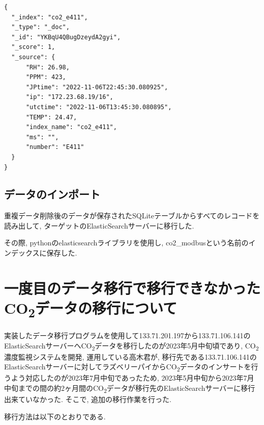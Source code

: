 \begin{lstlisting}[caption=\_sourceフィールドのメンバー数が多いドキュメント, label=sc2]
{
  "_index": "co2_e411",
  "_type": "_doc",
  "_id": "YKBqU4QBugDzeydA2gyi",
  "_score": 1,
  "_source": {
      "RH": 26.98,
      "PPM": 423,
      "JPtime": "2022-11-06T22:45:30.080925",
      "ip": "172.23.68.19/16",
      "utctime": "2022-11-06T13:45:30.080895",
      "TEMP": 24.47,
      "index_name": "co2_e411",
      "ms": "",
      "number": "E411"
  }
}
    \end{lstlisting}

\subsection{データのインポート}
重複データ削除後のデータが保存されたSQLiteテーブルからすべてのレコードを読み出して, ターゲットのElasticSearchサーバーに移行した.

その際, pythonのelasticsearchライブラリを使用し, co2\_modbusという名前のインデックスに保存した.

\section{一度目のデータ移行で移行できなかったCO\textsubscript{2}データの移行について}

実装したデータ移行プログラムを使用して133.71.201.197から133.71.106.141のElasticSearchサーバーへCO\textsubscript{2}データを移行したのが2023年5月中旬頃であり, CO\textsubscript{2}濃度監視システムを開発, 運用している高木君が, 移行先である133.71.106.141のElasticSearchサーバーに対してラズベリーパイからCO\textsubscript{2}データのインサートを行うよう対応したのが2023年7月中旬であったため, 2023年5月中旬から2023年7月中旬までの間の約2ヶ月間のCO\textsubscript{2}データが移行先のElasticSearchサーバーに移行出来ていなかった. そこで, 追加の移行作業を行った.

移行方法は以下のとおりである.

